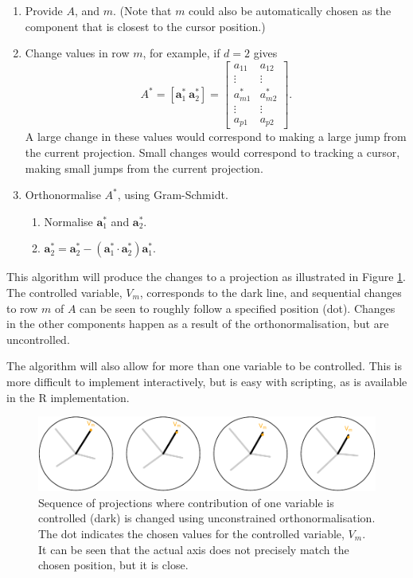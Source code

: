 \documentclass[]{interact}
\theoremstyle{plain}%
\theoremstyle{definition}
\theoremstyle{remark}
\providecommand{\tightlist}{%
  \setlength{\itemsep}{0pt}\setlength{\parskip}{0pt}}
\def\tightlist{}
\begin{document}
\begin{enumerate}
\def\labelenumi{\arabic{enumi}.}
\tightlist
\item
  Provide \(A\), and \(m\). (Note that \(m\) could also be automatically
  chosen as the component that is closest to the cursor position.)
\item
  Change values in row \(m\), for example, if \(d=2\) gives \[
  A^* = [ \boldsymbol{a}^*_1~\boldsymbol{a}^*_2 ] = \left[ \begin{array}{cc} a_{11} & a_{12}\\
                             \vdots & \vdots \\
                             a^*_{m1} & a^*_{m2}\\
                             \vdots & \vdots \\
                             a_{p1} & a_{p2} 
       \end{array}\right].
  \] \noindent A large change in these values would correspond to making
  a large jump from the current projection. Small changes would
  correspond to tracking a cursor, making small jumps from the current
  projection.
\item
  Orthonormalise \(A^*\), using Gram-Schmidt.

  \begin{enumerate}
  \def\labelenumii{\roman{enumii}.}
  \tightlist
  \item
    Normalise \(\boldsymbol{a}^*_1\) and \(\boldsymbol{a}^*_2\).
  \item
    \(\boldsymbol{a}^*_2 = \boldsymbol{a}^*_2 - (\boldsymbol{a}^*_1\cdot\boldsymbol{a}^*_2)\boldsymbol{a}^*_1\).
  \end{enumerate}
\end{enumerate}

This algorithm will produce the changes to a projection as illustrated
in Figure \ref{fig:manualsequence}. The controlled variable, \(V_m\),
corresponds to the dark line, and sequential changes to row \(m\) of
\(A\) can be seen to roughly follow a specified position (dot). Changes
in the other components happen as a result of the orthonormalisation,
but are uncontrolled.

The algorithm will also allow for more than one variable to be
controlled. This is more difficult to implement interactively, but is
easy with scripting, as is available in the R implementation.

\begin{figure}
\includegraphics[width=1\linewidth]{paper_files/figure-latex/manualsequence-1} \caption{Sequence of projections where contribution of one variable is controlled (dark) is changed using unconstrained orthonormalisation. The dot indicates the chosen values for the controlled variable, $V_m$. It can be seen that the actual axis does not precisely match the chosen position, but it is close.}\label{fig:manualsequence}
\end{figure}
\end{document}
